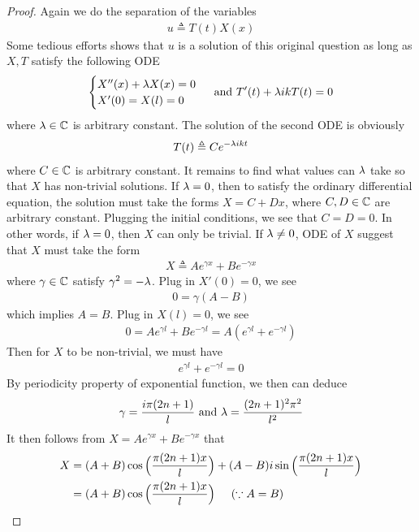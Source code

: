 \documentclass{report}
\begin{document}
\begin{proof}
Again we do the separation of the variables 
\begin{align*}
u\triangleq T(t)X(x)
\end{align*}
Some tedious efforts shows that $u$ is a solution of this original question as long as $X,T$ satisfy the following ODE 
\begin{align*}
\begin{cases}
  X''(x)+\lambda  X(x)=0\\
  X'(0)=X(l)=0
\end{cases}\text{ and }T'(t)+\lambda  ik T(t)=0
\end{align*}
where $\lambda \in\mathbb{C}$ is arbitrary constant. The solution of the second ODE is obviously 
\begin{align*}
T(t)\triangleq Ce^{-\lambda  ik t}
\end{align*}
where $C\in\mathbb{C}$ is arbitrary constant. It remains to find what values can $\lambda $ take so that $X$ has non-trivial solutions.  If $\lambda =0$, then to satisfy the ordinary differential equation, the solution must take the forms $X=C+Dx$, where $C,D\in\mathbb{C}$ are arbitrary constant. Plugging the initial conditions, we see that $C=D=0$. In other words, if  $\lambda =0$, then $X$ can only be trivial. If $\lambda \neq 0$, ODE of $X$ suggest that  $X$ must take the form
\begin{align*}
X\triangleq Ae^{\gamma x}+Be^{-\gamma x}
\end{align*}
where $\gamma \in\mathbb{C}$ satisfy $\gamma ^2=-\lambda $. Plug in $X'(0)=0$, we see 
\begin{align*}
0=\gamma (A-B)
\end{align*}
which implies $A=B$. Plug in $X(l)=0$, we see 
\begin{align*}
0=A e^{\gamma  l}+B e^{- \gamma l}=A(e^{\gamma l}+e^{-\gamma l})
\end{align*}
Then for $X$ to be non-trivial, we must have  
 \begin{align*}
e^{\gamma l}+e^{-\gamma l} =0
\end{align*}
By periodicity property of exponential function, we then can deduce
\begin{align*}
\gamma = \frac{ i \pi(2n+1)}{l}\text{ and }\lambda = \frac{(2n+1)^2\pi ^2}{l^2}
\end{align*}
It then follows from $X=Ae^{\gamma x}+Be^{-\gamma x}$ that 
\begin{align*}
X&= (A+B) \cos \Big(\frac{\pi (2n +1) x}{l}\Big)+ (A-B)i\sin \Big(\frac{ \pi (2n+1)x}{l}\Big)\\
&=(A+B) \cos \Big(\frac{ \pi (2n+1) x}{l}\Big)\hspace{0.5cm}(\because A=B)
\end{align*}
\end{proof}
\end{document}

